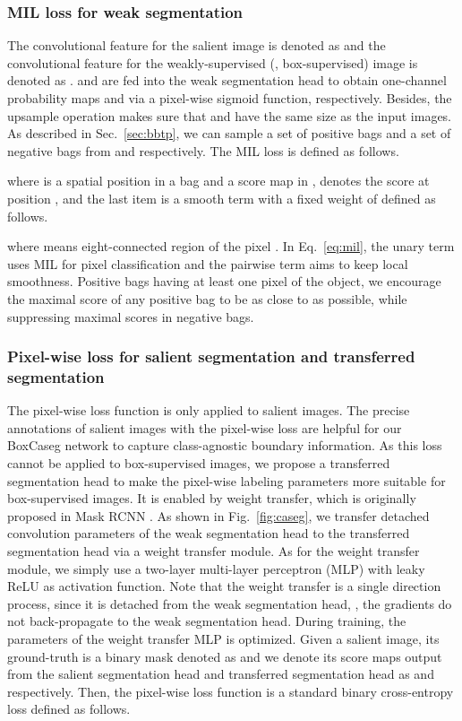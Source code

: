 \documentclass[final]{cvpr}
\begin{document}
\vspace{-3mm}
\subsubsection{MIL loss for weak segmentation}
\vspace{-2mm}
The convolutional feature for the salient image is denoted as  and the convolutional feature for the weakly-supervised (\ie, box-supervised) image is denoted as .  and  are fed into the weak segmentation head to obtain one-channel probability maps  and  via a pixel-wise sigmoid function, respectively. Besides, the upsample operation makes sure that  and  have the same size as the input images. As described in Sec.~\ref{sec:bbtp}, we can sample a set of positive bags  and a set of negative bags  from  and  respectively. The MIL loss is defined as follows.

where  is a spatial position in a bag  and a score map in ,  denotes the score at position , and the last item  is a smooth term with a fixed weight of  defined as follows. 

where  means eight-connected region of the pixel . In Eq.~\eqref{eq:mil}, the unary term uses MIL for pixel classification and the pairwise term aims to keep local smoothness. Positive bags having at least one pixel of the object, we encourage the maximal score of any positive bag to be as close to  as possible, while suppressing maximal scores in negative bags.



\vspace{-3mm}
\subsubsection{Pixel-wise loss for salient segmentation and transferred segmentation}
\vspace{-2mm}
The pixel-wise loss function is only applied to salient images. The precise annotations of salient images with the pixel-wise loss are helpful for our BoxCaseg network to capture class-agnostic boundary information. As this loss cannot be applied to box-supervised images, we propose a transferred segmentation head to make the pixel-wise labeling parameters more suitable for box-supervised images. It is enabled by weight transfer, which is originally proposed in Mask RCNN \cite{hu2018learning}. As shown in Fig.~\ref{fig:caseg}, we transfer detached convolution parameters of the weak segmentation head to the transferred segmentation head via a weight transfer module. As for the weight transfer module, we simply use a two-layer multi-layer perceptron (MLP) with leaky ReLU as activation function. Note that the weight transfer is a single direction process, since it is detached from the weak segmentation head, \ie, the gradients do not back-propagate to the weak segmentation head. During training, the parameters of the weight transfer MLP is optimized. Given a salient image, its ground-truth is a binary mask denoted as  and we denote its score maps output from the salient segmentation head and transferred segmentation head as  and  respectively. Then, the pixel-wise loss function is a standard binary cross-entropy loss defined as follows.
\end{document}
